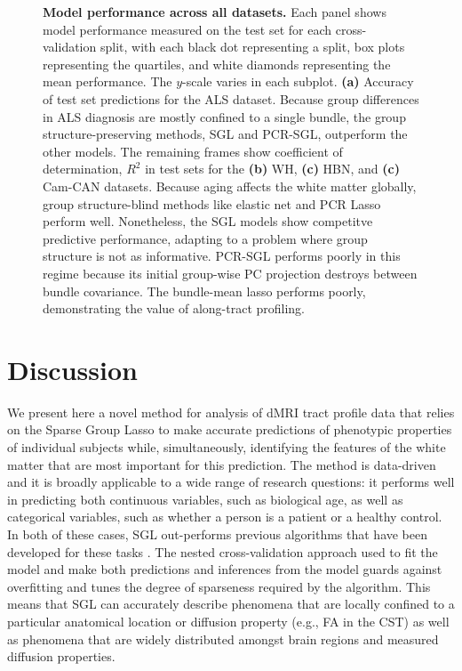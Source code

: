 \documentclass[10pt,letterpaper]{article}
\begin{document}
\begin{figure}[b!]
    \caption{%
    {\bf Model performance across all datasets.}
Each panel shows model performance measured on the test set for each
cross-validation split, with each black dot representing a split, box
plots representing the quartiles, and white diamonds representing the mean
performance. The $y$-scale varies in each subplot.
\textbf{(a)} Accuracy of test set predictions for the
ALS dataset. Because group differences
in ALS diagnosis are mostly confined to a single bundle, the group
structure-preserving methods, SGL and PCR-SGL, outperform the other
models.
The remaining frames show coefficient of determination, \protect$R^2$ in test sets
for the \textbf{(b)} WH, \textbf{(c)} HBN, and \textbf{(c)} Cam-CAN
datasets. Because aging affects the white matter globally, group structure-blind
methods like elastic net and PCR Lasso perform well. Nonetheless, the SGL
models show competitve predictive performance, adapting to a problem where
group structure is not as informative. PCR-SGL performs poorly in this regime
because its initial group-wise PC projection destroys between bundle covariance.
The bundle-mean lasso performs poorly, demonstrating the value of along-tract profiling.
    \label{fig:model-performance}
    }
\end{figure}

\section*{Discussion}

We present here a novel method for analysis of dMRI tract profile data that
relies on the Sparse Group Lasso \cite{simon2013sparse} to make accurate
predictions of phenotypic properties of individual subjects while,
simultaneously, identifying the features of the white matter that are most
important for this prediction. The method is data-driven and it is broadly
applicable to a wide range of research questions: it performs well in
predicting both continuous variables, such as biological age, as well as
categorical variables, such as whether a person is a patient or a healthy
control. In both of these cases, SGL out-performs previous algorithms that
have been developed for these tasks \cite{sarica2017corticospinal,
Richard2018-ux, mcpherson2020single}. The nested cross-validation approach
used to fit the model and make both predictions and inferences from the model
guards against overfitting and tunes the degree of sparseness required by the
algorithm. This means that SGL can accurately describe phenomena that are
locally confined to a particular anatomical location or diffusion property
(e.g., FA in the CST) as well as phenomena that are widely distributed
amongst brain regions and measured diffusion properties.
\end{document}

